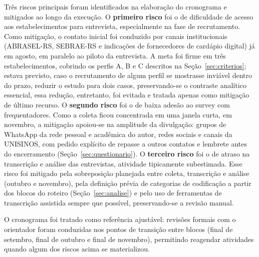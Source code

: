 Três riscos principais foram identificados na elaboração do cronograma e mitigados ao longo da execução. O \textbf{primeiro risco} foi o de dificuldade de acesso aos estabelecimentos para entrevista, especialmente na fase de recrutamento. Como mitigação, o contato inicial foi conduzido por canais institucionais (ABRASEL-RS, SEBRAE-RS e indicações de fornecedores de cardápio digital) já em agosto, em paralelo ao piloto da entrevista. A meta foi firme em três estabelecimentos, cobrindo os perfis A, B e C descritos na Seção~\ref{sec:criterios}; estava previsto, caso o recrutamento de algum perfil se mostrasse inviável dentro do prazo, reduzir o estudo para dois casos, preservando-se o contraste analítico essencial, essa redução, entretanto, foi evitada e tratada apenas como mitigação de último recurso. O \textbf{segundo risco} foi o de baixa adesão ao survey com frequentadores. Como a coleta ficou concentrada em uma janela curta, em novembro, a mitigação apoiou-se na amplitude da divulgação: grupos de WhatsApp da rede pessoal e acadêmica do autor, redes sociais e canais da UNISINOS, com pedido explícito de repasse a outros contatos e lembrete antes do encerramento (Seção~\ref{sec:questionario}). O \textbf{terceiro risco} foi o de atraso na transcrição e análise das entrevistas, atividade tipicamente subestimada. Esse risco foi mitigado pela sobreposição planejada entre coleta, transcrição e análise (outubro e novembro), pela definição prévia de categorias de codificação a partir dos blocos do roteiro (Seção~\ref{sec:analise}) e pelo uso de ferramentas de transcrição assistida sempre que possível, preservando-se a revisão manual.

O cronograma foi tratado como referência ajustável: revisões formais com o orientador foram conduzidas nos pontos de transição entre blocos (final de setembro, final de outubro e final de novembro), permitindo reagendar atividades quando algum dos riscos acima se materializou.
